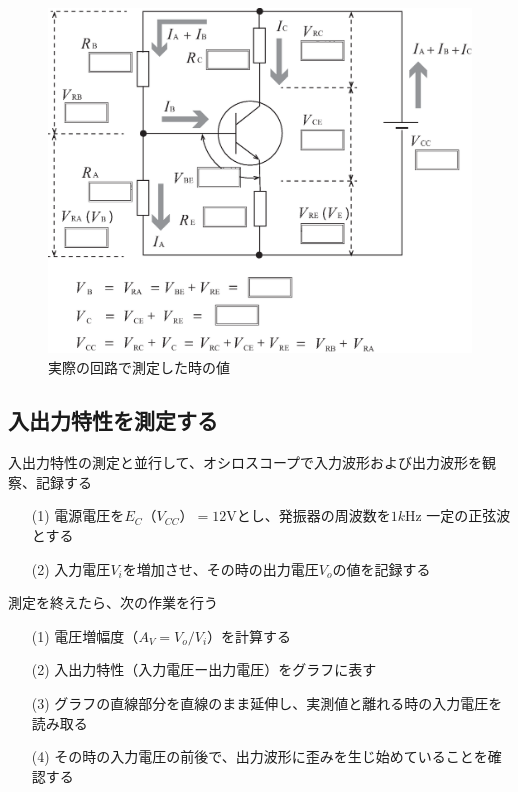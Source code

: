 \documentclass[uplatex,a4paper,11pt,oneside,openany]{jsbook}
\begin{document}
\vfill

\begin{figure}[H]
	\centering
	\includegraphics[keepaspectratio, scale=0.56, angle=0]
	{figs/eps/p96fig3b.eps}
	\caption{実際の回路で測定した時の値}
	\label{fig:11_1}
\end{figure}

\newpage

\subsection{入出力特性を測定する}

入出力特性の測定と並行して、オシロスコープで入力波形および出力波形を観察、記録する

\begin{enumerate}
	\item[(1)] 電源電圧を$E_C（V_{CC}）=12$Vとし、発振器の周波数を$1k$Hz 一定の正弦波とする
	\item[(2)] 入力電圧$V_i$を増加させ、その時の出力電圧$V_o$の値を記録する
\end{enumerate}

測定を終えたら、次の作業を行う

\begin{enumerate}
	\item[(1)] 電圧増幅度（$A_V=V_o/V_i$）を計算する
	\item[(2)] 入出力特性（入力電圧ー出力電圧）をグラフに表す 
	\item[(3)] グラフの直線部分を直線のまま延伸し、実測値と離れる時の入力電圧を読み取る
	\item[(4)] その時の入力電圧の前後で、出力波形に歪みを生じ始めていることを確認する
\end{enumerate}
\end{document}
